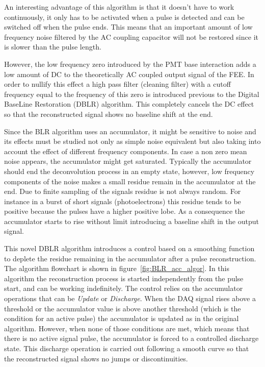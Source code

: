 \documentclass[a4paper, 10pt, oneside, twocolumn, 3p]{elsarticle}
\begin{document}
\par An interesting advantage of this algorithm is that it doesn't have to work continuously, it only has to be activated when a pulse is detected and can be switched off when the pulse ends. This means that an important amount of low frequency noise filtered by the AC coupling capacitor will not be restored since it is slower than the pulse length.

\par However, the low frequency zero introduced by the PMT base interaction adds a low amount of DC to the theoretically AC coupled output signal of the FEE. In order to nullify this effect a high pass filter (cleaning filter) with a cutoff frequency equal to the frequency of this zero is introduced previous to the Digital BaseLine Restoration (DBLR) algorithm. This completely cancels the DC effect so that the reconstructed signal shows no baseline shift at the end. 

\par Since the BLR algorithm uses an accumulator, it might be sensitive to noise and its effects must be studied not only as simple noise equivalent but also taking into account the effect of different frequency components. In case a non zero mean noise appears, the accumulator might get saturated. Typically the accumulator should end the deconvolution process in an empty state, however, low frequency components of the noise makes a small residue remain in the accumulator at the end. Due to finite sampling of the signals residue is not always random. For instance in a burst of short signals (photoelectrons) this residue tends to be positive because the pulses have a higher positive lobe. As a consequence the accumulator starts to rise without limit introducing a baseline shift in the output signal.

\par This novel DBLR algorithm introduces a control based on a smoothing function to deplete the residue remaining in the accumulator after a pulse reconstruction. The algorithm flowchart is shown in figure~\ref{fig:BLR_acc_algor}. In this algorithm the reconstruction process is started independently from the pulse start, and can be working indefinitely. The control relies on the accumulator operations that can be \emph{Update} or \emph{Discharge}. When the DAQ signal rises above a  threshold or the accumulator value is above another threshold (which is the condition for an active pulse) the accumulator is updated as in the original algorithm. However, when none of those conditions are met, which means that there is no active signal pulse, the accumulator is forced to a controlled discharge state. This discharge operation is carried out following a smooth curve so that the reconstructed signal shows no jumps or discontinuities.
\end{document}
